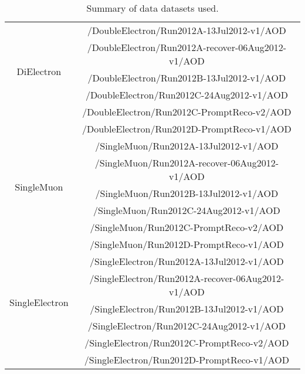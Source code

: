 \begin{table}[!ht]
\begin{center}
\begin{tabular}{|c|c|}
\hline
\multirow{5}{*}{DiElectron}             &  /DoubleElectron/Run2012A-13Jul2012-v1/AOD            \\
                                        &  /DoubleElectron/Run2012A-recover-06Aug2012-v1/AOD    \\
                                        &  /DoubleElectron/Run2012B-13Jul2012-v1/AOD            \\
                                        &  /DoubleElectron/Run2012C-24Aug2012-v1/AOD            \\
                                        &  /DoubleElectron/Run2012C-PromptReco-v2/AOD           \\
                                        &  /DoubleElectron/Run2012D-PromptReco-v1/AOD           \\
\hline
\multirow{5}{*}{SingleMuon}             &  /SingleMuon/Run2012A-13Jul2012-v1/AOD            \\
                                        &  /SingleMuon/Run2012A-recover-06Aug2012-v1/AOD    \\
                                        &  /SingleMuon/Run2012B-13Jul2012-v1/AOD            \\
                                        &  /SingleMuon/Run2012C-24Aug2012-v1/AOD            \\
                                        &  /SingleMuon/Run2012C-PromptReco-v2/AOD           \\
                                        &  /SingleMuon/Run2012D-PromptReco-v1/AOD           \\
\hline
\multirow{5}{*}{SingleElectron}         &  /SingleElectron/Run2012A-13Jul2012-v1/AOD            \\
                                        &  /SingleElectron/Run2012A-recover-06Aug2012-v1/AOD    \\
                                        &  /SingleElectron/Run2012B-13Jul2012-v1/AOD            \\
                                        &  /SingleElectron/Run2012C-24Aug2012-v1/AOD            \\
                                        &  /SingleElectron/Run2012C-PromptReco-v2/AOD           \\
                                        &  /SingleElectron/Run2012D-PromptReco-v1/AOD           \\
\hline
\end{tabular}
\caption{Summary of data datasets used.\label{tab:DatasetsData}}
\end{center}
\end{table}

